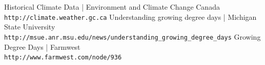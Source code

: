 \documentclass[12pt]{article}
\begin{document}

\pagebreak




\begin{thebibliography}{2}
Historical Climate Data | Environment and Climate Change Canada
\\\texttt{http://climate.weather.gc.ca}
Understanding growing degree days | Michigan State University
\\\texttt{http://msue.anr.msu.edu/news/understanding\_growing\_degree\_days}
Growing Degree Days | Farmwest
\\\texttt{http://www.farmwest.com/node/936}
\end{thebibliography}
\end{document}
